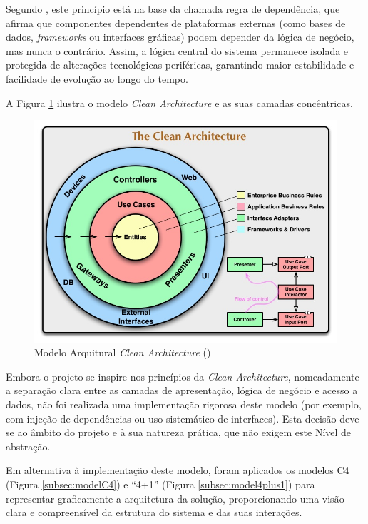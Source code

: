 Segundo \cite{Lano2023}, este princípio está na base da chamada regra de dependência, que afirma que componentes dependentes de plataformas externas (como bases de dados, \textit{frameworks} ou interfaces gráficas) podem depender da lógica de negócio, mas nunca o contrário. Assim, a lógica central do sistema permanece isolada e protegida de alterações tecnológicas periféricas, garantindo maior estabilidade e facilidade de evolução ao longo do tempo.

A Figura \ref{fig:cleanArchitecture} ilustra o modelo \textit{Clean Architecture} e as suas camadas concêntricas.

\begin{figure}[H]
    \centering
    \includegraphics[width=5.5in,keepaspectratio]{frontmatter/assets/models/CleanArchitecture.jpg}
    \caption{Modelo Arquitural \textit{Clean Architecture} (\cite{Martin2012})}
    \label{fig:cleanArchitecture}
\end{figure}

Embora o projeto se inspire nos princípios da \textit{Clean Architecture}, nomeadamente a separação clara entre as camadas de apresentação, lógica de negócio e acesso a dados, não foi realizada uma implementação rigorosa deste modelo (por exemplo, com injeção de dependências ou uso sistemático de interfaces). Esta decisão deve-se ao âmbito do projeto e à sua natureza prática, que não exigem este Nível de abstração.

Em alternativa à implementação deste modelo, foram aplicados os modelos C4 (Figura \ref{subsec:modelC4}) e “4+1” (Figura \ref{subsec:model4plus1}) para representar graficamente a arquitetura da solução, proporcionando uma visão clara e compreensível da estrutura do sistema e das suas interações.


